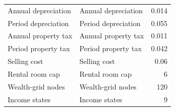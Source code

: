 \begin{tabularx}{\linewidth}{XXr}
Annual depreciation & Annual depreciation & 0.014 \\
Period depreciation & Period depreciation & 0.055 \\
Annual property tax & Annual property tax & 0.011 \\
Period property tax & Period property tax & 0.042 \\
Selling cost & Selling cost & 0.06 \\
Rental room cap & Rental room cap & 6 \\
Wealth-grid nodes & Wealth-grid nodes & 120 \\
Income states & Income states & 9 \\
\bottomrule
\end{tabularx}
\endgroup
